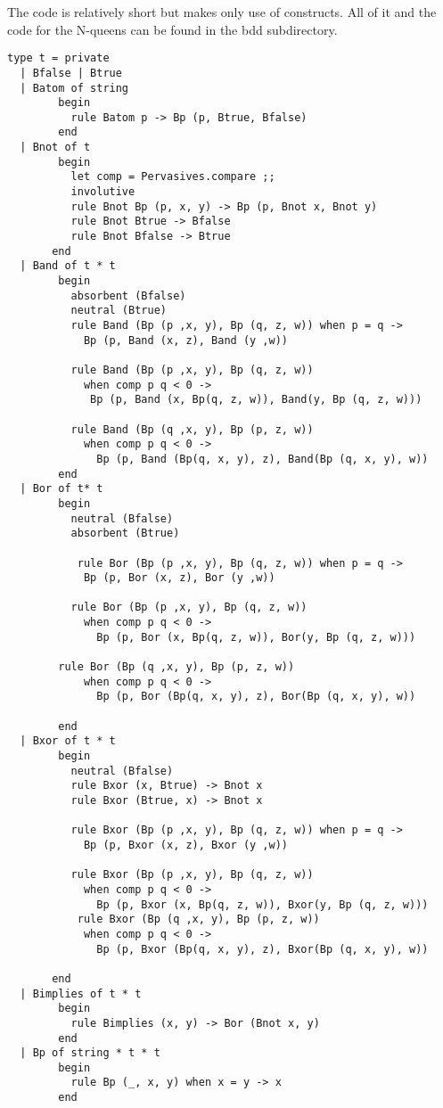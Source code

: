 The \moca code is relatively short but makes only use of \mrule
constructs. All of it and the code for the N-queens can be found in
the {\sf bdd} subdirectory. 
\begin{lstlisting}
type t = private
  | Bfalse | Btrue
  | Batom of string
        begin
          rule Batom p -> Bp (p, Btrue, Bfalse)
        end
  | Bnot of t
        begin
          let comp = Pervasives.compare ;;
          involutive
          rule Bnot Bp (p, x, y) -> Bp (p, Bnot x, Bnot y) 
          rule Bnot Btrue -> Bfalse
          rule Bnot Bfalse -> Btrue
       end
  | Band of t * t
        begin
          absorbent (Bfalse)
          neutral (Btrue)
          rule Band (Bp (p ,x, y), Bp (q, z, w)) when p = q ->
            Bp (p, Band (x, z), Band (y ,w))

          rule Band (Bp (p ,x, y), Bp (q, z, w))
            when comp p q < 0 ->
             Bp (p, Band (x, Bp(q, z, w)), Band(y, Bp (q, z, w)))
            
          rule Band (Bp (q ,x, y), Bp (p, z, w))
            when comp p q < 0 ->
              Bp (p, Band (Bp(q, x, y), z), Band(Bp (q, x, y), w))
        end
  | Bor of t* t
        begin
          neutral (Bfalse)
          absorbent (Btrue)

           rule Bor (Bp (p ,x, y), Bp (q, z, w)) when p = q ->
            Bp (p, Bor (x, z), Bor (y ,w))

          rule Bor (Bp (p ,x, y), Bp (q, z, w))
            when comp p q < 0 ->
              Bp (p, Bor (x, Bp(q, z, w)), Bor(y, Bp (q, z, w)))

        rule Bor (Bp (q ,x, y), Bp (p, z, w))
            when comp p q < 0 ->
              Bp (p, Bor (Bp(q, x, y), z), Bor(Bp (q, x, y), w))
          
        end
  | Bxor of t * t
        begin
          neutral (Bfalse)
          rule Bxor (x, Btrue) -> Bnot x
          rule Bxor (Btrue, x) -> Bnot x
          
          rule Bxor (Bp (p ,x, y), Bp (q, z, w)) when p = q ->
            Bp (p, Bxor (x, z), Bxor (y ,w))

          rule Bxor (Bp (p ,x, y), Bp (q, z, w))
            when comp p q < 0 ->
              Bp (p, Bxor (x, Bp(q, z, w)), Bxor(y, Bp (q, z, w)))
           rule Bxor (Bp (q ,x, y), Bp (p, z, w))
            when comp p q < 0 ->
              Bp (p, Bxor (Bp(q, x, y), z), Bxor(Bp (q, x, y), w))
          
       end
  | Bimplies of t * t 
        begin
          rule Bimplies (x, y) -> Bor (Bnot x, y)
        end
  | Bp of string * t * t
        begin
          rule Bp (_, x, y) when x = y -> x          
        end

\end{lstlisting}

